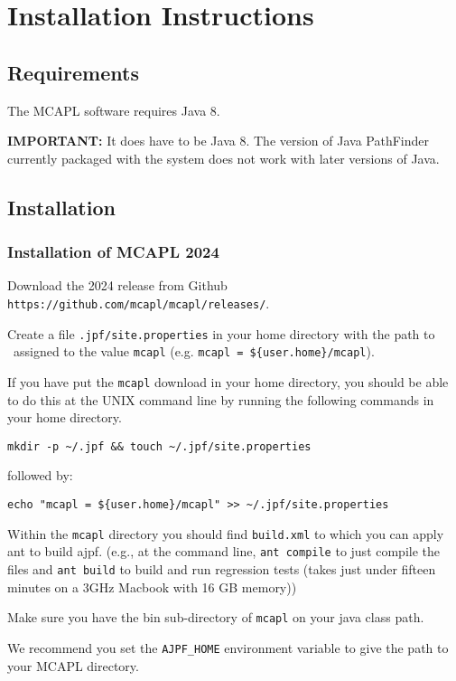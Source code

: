 \chapter{Installation Instructions}
\label{chap:installation}
\section{Requirements}

The MCAPL software requires Java 8.   

{\bf IMPORTANT:} It does have to be Java 8.  The version of Java PathFinder currently packaged with the system does not work with later versions of Java.

\section{Installation}

\subsection{Installation of MCAPL 2024}

\begin{itemize}
\begin{sloppypar}
\item Download the 2024 release from Github \texttt{https://github.com/mcapl/mcapl/releases/}.
\end{sloppypar}
\item Create a file \texttt{.jpf/site.properties} in your home directory with the path to \ajpfversion\ assigned to the value \texttt{mcapl}
  (e.g. \texttt{mcapl = \$\{user.home\}/mcapl}).
  
If you have put the \texttt{mcapl} download in your home directory,  you should be able to do this at the UNIX command line by running the following commands in your home directory.
\begin{verbatim}
mkdir -p ~/.jpf && touch ~/.jpf/site.properties
\end{verbatim}
followed by:
\begin{verbatim}
echo "mcapl = ${user.home}/mcapl" >> ~/.jpf/site.properties
\end{verbatim}

\item Within the \texttt{mcapl} directory you should find \texttt{build.xml} to which you can apply ant to build ajpf. (e.g., at the command line, \lstinline{ant compile} to just compile the files and \lstinline{ant build} to build and run regression tests (takes just under fifteen minutes on a 3GHz Macbook with 16 GB memory))
\item Make sure you have the bin sub-directory of \texttt{mcapl} on your java class path.
\item We recommend you set the \texttt{AJPF\_HOME} environment variable to give the path to your MCAPL directory.
\end{itemize}

